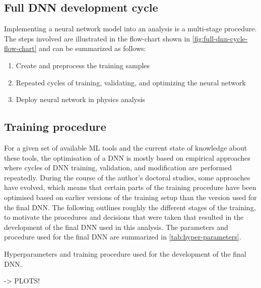 \subsection{Full DNN development cycle}
Implementing a neural network model into an analysis is a multi-stage procedure. 
The steps involved are illustrated in the flow-chart shown in \cref{fig:full-dnn-cycle-flow-chart} and can be summarized as follows:

\begin{enumerate}
    \item Create and preprocess the training samples
    \item Repeated cycles of training, validating, and optimizing the neural network
    \item Deploy neural network in physics analysis
\end{enumerate}


\subsection{Training procedure}
For a given set of available ML tools and the current state of knowledge about these tools, the optimisation of a DNN is mostly based on empirical approaches where cycles of DNN training, validation, and modification are performed repeatedly. 
During the course of the author's doctoral studies, some approaches have evolved, which means that certain parts of the training procedure have been optimised based on earlier versions of the training setup than the version used for the final DNN. 
The following outlines roughly the different stages of the training, to motivate the procedures and decisions that were taken that resulted in the development of the final DNN used in this analysis. 
The parameters and procedure used for the final DNN are summarized in \cref{tab:hyper-parameters}.


\begin{table}[ht]
    \begin{center}
    
    \end{center}
    \caption{Hyperparameters and training procedure used for the development of the final DNN.
    }
    \label{tab:DNN-info}
\end{table}



-> PLOTS!

